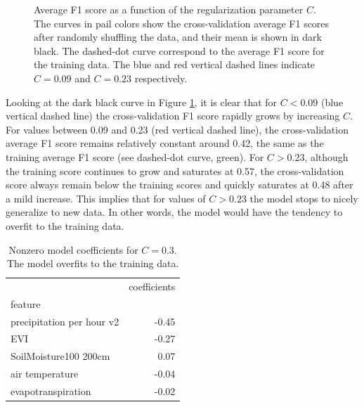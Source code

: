 \documentclass[10pt,parskip=half,
toc=sectionentrywithdots,
bibliography=totocnumbered,
captions=tableheading,numbers=noendperiod]{scrartcl}
\begin{document}
\begin{figure}[H]\begin{center}\end{center}\caption{Average F1 score as a function of the regularization parameter \(C\).
The curves in pail colors show the cross-validation average F1 scores
after randomly shuffling the data, and their mean is shown in dark
black. The dashed-dot curve correspond to the average F1 score for the
training data. The blue and red vertical dashed lines indicate
\(C=0.09\) and \(C=0.23\) respectively.}\label{fig_cv}\end{figure}

Looking at the dark black curve in Figure \ref{fig_cv}, it is clear that
for \(C<0.09\) (blue vertical dashed line) the cross-validation F1 score
rapidly grows by increasing \(C\). For values between 0.09 and 0.23 (red
vertical dashed line), the cross-validation average F1 score remains
relatively constant around 0.42, the same as the training average F1
score (see dashed-dot curve, green). For \(C>0.23\), although the
training score continues to grow and saturates at 0.57, the
cross-validation score always remain below the training scores and
quickly saturates at 0.48 after a mild increase. This implies that for
values of \(C>0.23\) the model stops to nicely generalize to new data.
In other words, the model would have the tendency to overfit to the
training data.

\begin{table}[H]
\caption{Nonzero model coefficients for \(C=0.3\). The model overfits to the
training data.}\label{tab_overfit}
\centering
\begin{adjustbox}{max width=\textwidth}
\begin{tabular}{lr}
\toprule
{} &  coefficients \\
feature                   &               \\
\midrule
precipitation per hour v2 &         -0.45 \\
EVI                       &         -0.27 \\
SoilMoisture100 200cm     &          0.07 \\
air temperature           &         -0.04 \\
evapotranspiration        &         -0.02 \\
\bottomrule
\end{tabular}

\end{adjustbox}
\end{table}
\end{document}
